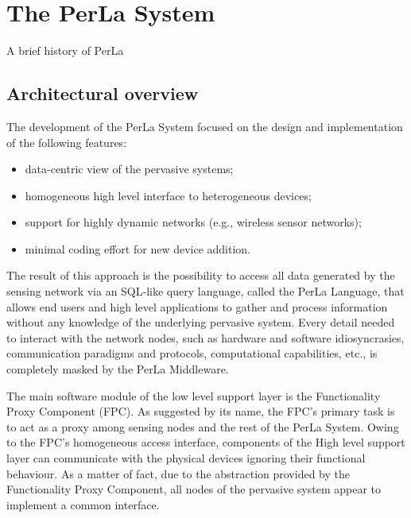 \chapter{The PerLa System}

A brief history of PerLa

\section{Architectural overview}

The development of the PerLa System focused on the design and implementation of
the following features:

\begin{itemize}

    \item data-centric view of the pervasive systems;

    \item homogeneous high level interface to heterogeneous
    devices;

    \item support for highly dynamic networks (e.g., wireless
    sensor networks);

    \item minimal coding effort for new device addition.

\end{itemize}

The result of this approach is the possibility to access all data generated by
the sensing network via an SQL-like query language, called the PerLa Language,
that allows end users and high level applications to gather and process
information without any knowledge of the underlying pervasive system. Every
detail needed to interact with the network nodes, such as hardware and software
idiosyncrasies, communication paradigms and protocols, computational
capabilities, etc., is completely masked by the PerLa Middleware.

The main software module of the low level support layer is the Functionality
Proxy Component (FPC). As suggested by its name, the FPC’s primary task is to
act as a proxy among sensing nodes and the rest of the PerLa System. Owing to
the FPC’s homogeneous access interface, components of the High level support
layer can communicate with the physical devices ignoring their functional
behaviour. As a matter of fact, due to the abstraction provided by the
Functionality Proxy Component, all nodes of the pervasive system appear to
implement a common interface.

